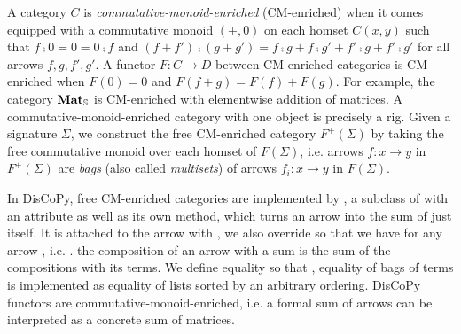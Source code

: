 A category $C$ is \emph{commutative-monoid-enriched} (CM-enriched) when it comes equipped with a commutative monoid $(+, 0)$ on each homset $C(x, y)$ such that $f \fcmp 0 = 0 = 0 \fcmp f$ and $(f + f') \fcmp (g + g') = f \fcmp g + f \fcmp g' + f' \fcmp g + f' \fcmp g'$ for all arrows $f, g, f', g'$.
A functor $F : C \to D$ between CM-enriched categories is CM-enriched when $F(0) = 0$ and $F(f + g) = F(f) + F(g)$.
For example, the category $\mathbf{Mat}_\S$ is CM-enriched with elementwise addition of matrices.
A commutative-monoid-enriched category with one object is precisely a rig.
Given a signature $\Sigma$, we construct the free CM-enriched category $F^+(\Sigma)$ by taking the free commutative monoid over each homset of $F(\Sigma)$, i.e. arrows $f : x \to y$ in $F^+(\Sigma)$ are \emph{bags} (also called \emph{multisets}) of arrows $f_i : x \to y$ in $F(\Sigma)$.

In DisCoPy, free CM-enriched categories are implemented by , a subclass of  with an attribute  as well as its own  method, which turns an arrow into the sum of just itself.
It is attached to the arrow with , we also override  so that we have   for any arrow , i.e. .
the composition of an arrow with a sum is the sum of the compositions with its terms.
We define equality so that , equality of bags of terms is implemented as equality of lists sorted by an arbitrary ordering.
DisCoPy functors are commutative-monoid-enriched, i.e. a formal sum of arrows can be interpreted as a concrete sum of matrices.

